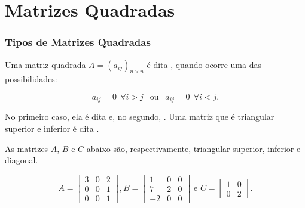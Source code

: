 \section{Matrizes Quadradas}


\begin{frame}
    \frametitle{Tipos de Matrizes Quadradas}
    
    \begin{definicao}
        Uma matriz quadrada $A=(a_{ij})_{n\times n}$ é dita , quando ocorre uma das possibilidades:
        
        $$a_{ij} = 0 \ \ \forall i>j \ \  \text{ ou } \ \  a_{ij} = 0 \ \  \forall i<j.$$

        No primeiro caso, ela é dita  e, no segundo, . Uma matriz que é triangular superior e inferior é dita .
    \end{definicao}\pause

    \begin{exemplo}
        As matrizes $A$, $B$ e $C$ abaixo são, respectivamente, triangular superior, inferior e diagonal.
        
        \begin{displaymath} A = 
            \begin{bmatrix}
                3 & 0 & 2 \\
                0 & 0 & 1 \\
                0 & 0 & 1
            \end{bmatrix}
        ,    
        B=
            \begin{bmatrix}
                1 & 0 & 0 \\
                7 & 2 & 0 \\
                -2 & 0 & 0
            \end{bmatrix}
        \text{ e } C = 
            \begin{bmatrix}
                1 & 0  \\
                0 & 2  
            \end{bmatrix}.
        \end{displaymath}
    \end{exemplo}
\end{frame}



